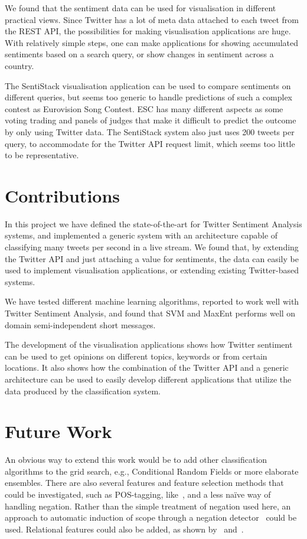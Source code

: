 We found that the sentiment data can be used for visualisation in different practical views. Since Twitter has a lot of meta data attached to each tweet from the REST API, the possibilities for making visualisation applications are huge. With relatively simple steps, one can make applications for showing accumulated sentiments based on a search query, or show changes in sentiment across a country.

The SentiStack visualisation application can be used to compare sentiments on different queries, but seems too generic to handle predictions of such a complex contest as Eurovision Song Contest. ESC has many different aspects as some voting trading and panels of judges that make it difficult to predict the outcome by only using Twitter data. The SentiStack system also just uses 200 tweets per query, to accommodate for the Twitter API request limit, which seems too little to be representative.

\section{Contributions}

In this project we have defined the state-of-the-art for Twitter Sentiment Analysis systems, and implemented a generic system with an architecture capable of classifying many tweets per second in a live stream. We found that, by extending the Twitter API and just attaching a value for sentiments, the data can easily be used to implement visualisation applications, or extending existing Twitter-based systems. 

We have tested different machine learning algorithms, reported to work well with Twitter Sentiment Analysis, and found that SVM and MaxEnt performs well on domain semi-independent short messages.

The development of the visualisation applications shows how Twitter sentiment can be used to get opinions on different topics, keywords or from certain locations. It also shows how the combination of the Twitter API and a generic architecture can be used to easily develop different applications that utilize the data produced by the classification system.

\section{Future Work}

An obvious way to extend this work would be to add other classification algorithms to the grid search, e.g., Conditional Random Fields or more elaborate ensembles. There are also several
features and feature selection methods that could be investigated, such as POS-tagging, like~\cite{article:pak}, and a less na\"{i}ve way of handling negation. Rather than the simple treatment of negation used here, an approach to automatic induction of scope through a negation detector~\citep{CouncillEA:10} could be used. Relational features could also be added, as shown by~\cite{karlgren2010between} and~\cite{johansson2012relational}.

